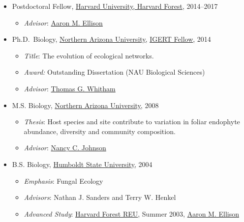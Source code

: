 \documentclass[a4paper]{article}
\begin{document}
\begin{itemize}
\item Postdoctoral Fellow,
  \href{https://harvardforest.fas.harvard.edu/}{Harvard University, Harvard Forest}, 2014--2017
  \begin{itemize}
    \item \emph{Advisor}: \href{https://harvardforest.fas.harvard.edu/aaron-ellison}{Aaron M. Ellison}
  \end{itemize}
\item 
  Ph.D.~Biology, \href{http://www.nau.edu}{Northern Arizona University},
  \href{http://www.mpcer.nau.edu/igert/}{IGERT Fellow}, 2014

  \begin{itemize}
  \item
    \emph{Title}: The evolution of ecological networks.
  \item
    \emph{Award:} Outstanding Dissertation (NAU Biological Sciences)
  \item
    \emph{Advisor}:
    \href{http://www6.nau.edu/biology/People/Faculty/Whitham/Whitham.htm}{Thomas
    G. Whitham}
  \end{itemize}
\item
  M.S. Biology, \href{http://www.nau.edu}{Northern Arizona University},
  2008
  \begin{itemize}
  \item
    \emph{Thesis}: Host species and site contribute to variation in
    foliar endophyte abundance, diversity and community composition.
  \item
    \emph{Advisor}:
    \href{http://www.nau.edu/~envsci/johnsonlab/index.htm}{Nancy C.
    Johnson}
  \end{itemize}
\item
  B.S. Biology, \href{http://www.humboldt.edu/~biosci/}{Humboldt State
  University}, 2004

  \begin{itemize}
  \item
    \emph{Emphasis}: Fungal Ecology
  \item
    \emph{Advisors}: Nathan J. Sanders and Terry W. Henkel
  \item
    \emph{Advanced Study}:
    \href{http://harvardforest.fas.harvard.edu/education/reu/reu.html}{Harvard
      Forest REU}, Summer 2003,
    \href{http://harvardforest.fas.harvard.edu/profiles/ellison.html}{Aaron
      M. Ellison}
  \end{itemize}
\end{itemize}
\end{document}
